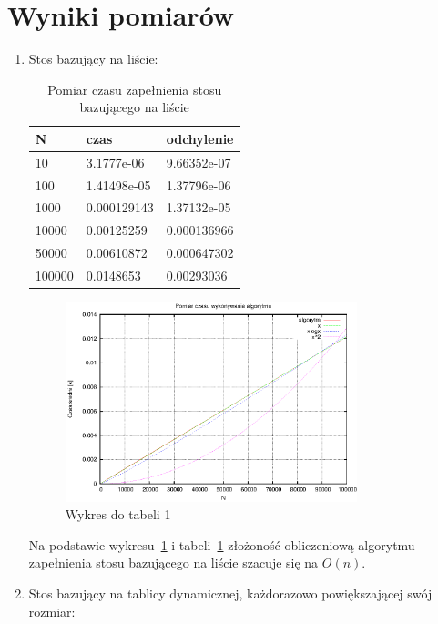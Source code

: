 \documentclass[a4paper,11pt]{article}
\begin{document}
\section{Wyniki pomiarów}
\begin{enumerate}
 \item Stos bazujący na liście:
   
  \begin{table}[th]
  \centering
    \caption{Pomiar czasu zapełnienia stosu bazującego na liście}

      \begin{tabular}{|l|l|l|}
      
	\hline
	N & czas & odchylenie \\
    \hline
  10 & 3.1777e-06 & 9.66352e-07\\
  \hline
100 & 1.41498e-05 & 1.37796e-06\\
\hline
1000 & 0.000129143 & 1.37132e-05\\
\hline
10000 & 0.00125259 & 0.000136966\\
\hline
50000 & 0.00610872 & 0.000647302\\
\hline
100000 & 0.0148653 & 0.00293036\\
\hline
    \end{tabular}
    \label{tab1}
    \end{table}
    \newpage
 \begin{figure}[th]
\centering
\includegraphics[width=0.8\textwidth]{wykres1.eps}
\caption{Wykres do tabeli 1}
\label{Wykres1}
\end{figure} 
Na podstawie wykresu~\ref{Wykres1} i tabeli~\ref{tab1} złożoność obliczeniową algorytmu zapełnienia stosu bazującego na liście szacuje się na $ O(n) $.

\item Stos bazujący na tablicy dynamicznej, każdorazowo powiększającej swój rozmiar:


\end{enumerate}
\end{document}
